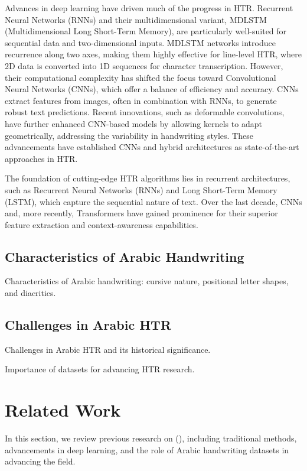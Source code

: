\documentclass[conference]{IEEEtran}
\begin{document}
Advances in deep learning have driven much of the progress in HTR. Recurrent Neural Networks (RNNs) and their multidimensional variant, MDLSTM (Multidimensional Long Short-Term Memory), are particularly well-suited for sequential data and two-dimensional inputs. MDLSTM networks introduce recurrence along two axes, making them highly effective for line-level HTR, where 2D data is converted into 1D sequences for character transcription. However, their computational complexity has shifted the focus toward Convolutional Neural Networks (CNNs), which offer a balance of efficiency and accuracy. CNNs extract features from images, often in combination with RNNs, to generate robust text predictions. Recent innovations, such as deformable convolutions, have further enhanced CNN-based models by allowing kernels to adapt geometrically, addressing the variability in handwriting styles. These advancements have established CNNs and hybrid architectures as state-of-the-art approaches in HTR.









The foundation of cutting-edge HTR algorithms lies in recurrent architectures, such as Recurrent Neural Networks (RNNs) and Long Short-Term Memory (LSTM), which capture the sequential nature of text. Over the last decade, CNNs and, more recently, Transformers have gained prominence for their superior feature extraction and context-awareness capabilities.




\subsection{Characteristics of Arabic Handwriting}

Characteristics of Arabic handwriting: cursive nature, positional letter shapes, and diacritics.

\subsection{Challenges in Arabic HTR}

Challenges in Arabic HTR and its historical significance.



Importance of datasets for advancing HTR research.


 
\section{Related Work}
In this section, we review previous research on (), including traditional methods, advancements in deep learning, and the role of Arabic handwriting datasets in advancing the field.
\end{document}
